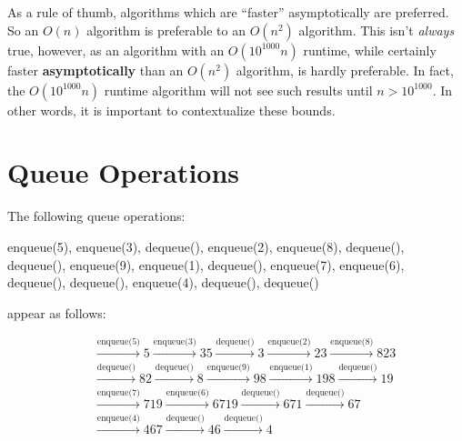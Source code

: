 \documentclass[a4paper]{article}
\begin{document}
As a rule of thumb, algorithms which are ``faster'' asymptotically are preferred. So an $O(n)$ algorithm is preferable to an $O(n^2)$ algorithm. This isn't \textit{always} true, however, as an algorithm with an $O(10^{1000}n)$ runtime, while certainly faster \textbf{asymptotically} than an $O(n^2)$ algorithm, is hardly preferable. In fact, the $O(10^{1000}n)$ runtime algorithm will not see such results until $n>10^{1000}$. In other words, it is important to contextualize these bounds.


\section{Queue Operations}
The following queue operations:

enqueue(5), enqueue(3), dequeue(), enqueue(2), enqueue(8), dequeue(), dequeue(), enqueue(9), enqueue(1), dequeue(), enqueue(7), enqueue(6), dequeue(), dequeue(), enqueue(4), dequeue(), dequeue()

appear as follows:

\begin{align*}
\boxed{\phantom{5}}&\xrightarrow{\text{enqueue(5)}}\boxed{5}\xrightarrow{\text{enqueue(3)}}\boxed{3}\boxed{5}\xrightarrow{\text{dequeue()}}\boxed{3}\xrightarrow{\text{enqueue(2)}}\boxed{2}\boxed{3}\xrightarrow{\text{enqueue(8)}}\boxed{8}\boxed{2}\boxed{3}\\&\xrightarrow{\text{dequeue()}}\boxed{8}\boxed{2}\xrightarrow{\text{dequeue()}}\boxed{8}\xrightarrow{\text{enqueue(9)}}\boxed{9}\boxed{8}\xrightarrow{\text{enqueue(1)}}\boxed{1}\boxed{9}\boxed{8}\xrightarrow{\text{dequeue()}}\boxed{1}\boxed{9}\\&\xrightarrow{\text{enqueue(7)}}\boxed{7}\boxed{1}\boxed{9}\xrightarrow{\text{enqueue(6)}}\boxed{6}\boxed{7}\boxed{1}\boxed{9}\xrightarrow{\text{dequeue()}}\boxed{6}\boxed{7}\boxed{1}\xrightarrow{\text{dequeue()}}\boxed{6}\boxed{7}\\&\xrightarrow{\text{enqueue(4)}}\boxed{4}\boxed{6}\boxed{7}\xrightarrow{\text{dequeue()}}\boxed{4}\boxed{6}\xrightarrow{\text{dequeue()}}\boxed{4}
\end{align*}
\end{document}
